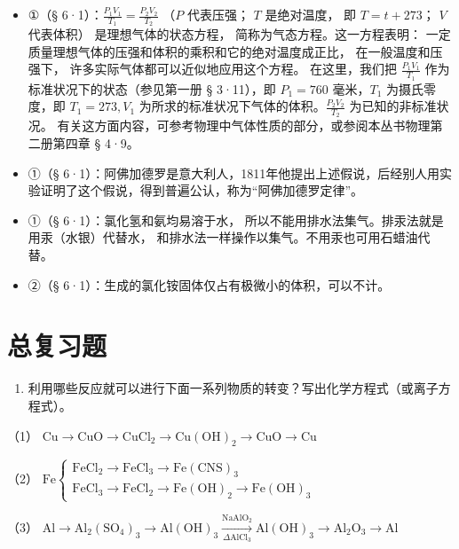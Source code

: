 \begin{itemize}
\item
  ①（§ 6·1）：\(\frac{P_1V_1}{T_1} = \frac{P_2V_2}{T_2}\) （\(P\)
  代表压强； \(T\) 是绝对温度， 即 \(T = t + 273\)； \(V\) 代表体积）
  是理想气体的状态方程， 简称为气态方程。这一方程表明：
  一定质量理想气体的压强和体积的乘积和它的绝对温度成正比，
  在一般温度和压强下， 许多实际气体都可以近似地应用这个方程。
  在这里，我们把 \(\frac{P_1V_1}{T_1}\) 作为标准状况下的状态（参见第一册
  § 3·11），即 \(P_{1} = 760\) 毫米，\(T_{1}\) 为摄氏零度，即
  \(T_{1} = 273, V_{1}\)
  为所求的标准状况下气体的体积。\(\frac{P_2V_2}{T_2}\)
  为已知的非标准状况。
  有关这方面内容，可参考物理中气体性质的部分，或参阅本丛书物理第二册第四章
  § 4·9。
\item
  ①（§
  6·1）：阿佛加德罗是意大利人，1811年他提出上述假说，后经别人用实验证明了这个假说，得到普遍公认，称为``阿佛加德罗定律''。
\item
  ①（§ 6·1）：氯化氢和氨均易溶于水，
  所以不能用排水法集气。排汞法就是用汞（水银）代替水，
  和排水法一样操作以集气。不用汞也可用石蜡油代替。
\item
  ②（§ 6·1）：生成的氯化铵固体仅占有极微小的体积，可以不计。
\end{itemize}

\chapter{总复习题}

\begin{enumerate}
\item
  利用哪些反应就可以进行下面一系列物质的转变？写出化学方程式（或离子方程式）。
\end{enumerate}

（1）
\(\mathrm{Cu} \longrightarrow \mathrm{CuO} \longrightarrow \mathrm{CuCl}_2 \longrightarrow \mathrm{Cu(OH)}_2 \longrightarrow \mathrm{CuO} \longrightarrow \mathrm{Cu}\)

（2）
\(\mathrm{Fe}\left\{ \begin{array}{l} \mathrm{FeCl}_{2} \longrightarrow \mathrm{FeCl}_{3} \longrightarrow \mathrm{Fe(CNS)}_{3} \\ \mathrm{FeCl}_{3} \longrightarrow \mathrm{FeCl}_{2} \longrightarrow \mathrm{Fe(OH)}_{2} \longrightarrow \mathrm{Fe(OH)}_{3} \end{array} \right.\)

（3）
\(\mathrm{Al} \rightarrow \mathrm{Al}_{2}(\mathrm{SO}_{4})_{3} \rightarrow \mathrm{Al(OH)}_{3} \xrightarrow[\Delta \mathrm{AlCl}_{3}]{\mathrm{NaAlO}_{2}} \mathrm{Al(OH)}_{3} \rightarrow \mathrm{Al}_{2} \mathrm{O}_{3} \rightarrow \mathrm{Al}\)

